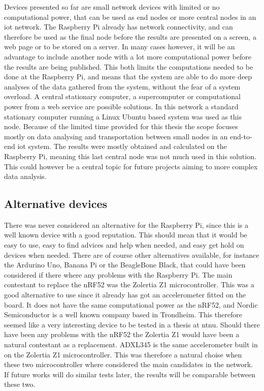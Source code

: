 \noindent Devices presented so far are small network devices with limited or no computational power, that can be used as end nodes or more central nodes in an \gls{iot} network. The Raspberry Pi already has network connectivity, and can therefore be used as the final node before the results are presented on a screen, a web page or to be stored on a server. In many cases however, it will be an advantage to include another node with a lot more computational power before the results are being published. This both limits the computations needed to be done at the Raspberry Pi, and means that the system are able to do more deep analyses of the data gathered from the system, without the fear of a system overload. A central stationary computer, a supercomputer or computational power from a web service are possible solutions. In this network a standard stationary computer running a Linux Ubuntu based system was used as this node. Because of the limited time provided for this thesis the scope focuses mostly on data analysing and transportation between small nodes in an end-to-end \gls{iot} system. The results were mostly obtained and calculated on the Raspberry Pi, meaning this last central node was not much used in this solution. This could however be a central topic for future projects aiming to more complex data analysis. 

\subsection{Alternative devices}

\noindent There was never considered an alternative for the Raspberry Pi, since this is a well known device with a good reputation. This should mean that it would be easy to use, easy to find advices and help when needed, and easy get hold on devices when needed. There are of course other alternatives available, for instance the Ardurino Uno, Banana Pi or the BeagleBone Black, that could have been considered if there where any problems with the Raspberry Pi. The main contestant to replace the nRF52 was the Zolertia Z1 microcontroller. This was a good alternative to use since it already has got an accelerometer fitted on the board. It does not have the same computational power as the nRF52, and Nordic Semiconductor is a well known company based in Trondheim. This therefore seemed like a very interesting device to be tested in a thesis at \gls{ntnu}. Should there have been any problems with the nRF52 the Zolertia Z1 would have been a natural contestant as a replacement. ADXL345 is the same accelerometer built in on the Zolertia Z1 microcontroller. This was therefore a natural choise when these two microcontroller where considered the main candidates in the network. If future works will do similar tests later, the results will be comparable between these two. 


